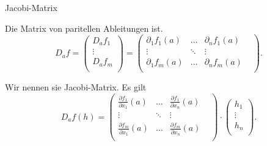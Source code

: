 \documentclass[class=article, crop=false]{standalone}
\begin{document}
\begin{zettel}{Jacobi-Matrix}
\begin{flashcard}
    \begin{definition}
        Die Matrix von paritellen Ableitungen ist.
\[
D_a f = \begin{pmatrix}
D_a f_1 \\
 \vdots \\
D_a f_m \\
\end{pmatrix}
=
\begin{pmatrix}
\partial_1 f_1 (a)       &  \dots  & \partial _n f_1 (a) \\
 \vdots &  \ddots &  \vdots &  \\
\partial_1 f_m (a)       &  \dots  & \partial_n f_m (a) \\
\end{pmatrix}
.\]

Wir nennen sie Jacobi-Matrix. Es gilt
\[
D_a f (h)= 
\begin{pmatrix}
    \frac{ \partial f_{1}}{\partial x_1} (a) &  \dots  & \frac{ \partial f_{1}}{\partial x_n} (a) \\
 \vdots &  \ddots &  \vdots &  \\
\frac{\partial f_{m}}{\partial x_1} (a)       &  \dots  & \frac{\partial f_{m}}{\partial x_n} (a) \\
\end{pmatrix} \cdot 
\begin{pmatrix}
h_1 \\
\vdots \\
h_n \\
\end{pmatrix}
.\]
\end{definition}

\end{flashcard}
\end{zettel}
\end{document}
